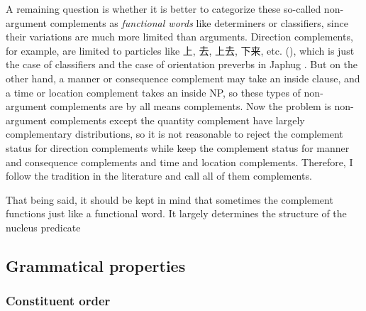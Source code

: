 \documentclass[../main.tex]{subfiles}
\begin{document}
A remaining question is whether it is better 
to categorize these so-called non-argument complements as \emph{functional words} like determiners or classifiers,
since their variations are much more limited than arguments.
Direction complements, for example, are limited to particles like 
上, 去, 上去, 下来, etc. (),
which is just the case of classifiers %
and the case of orientation preverbs in Japhug \citep[]{jacques2021grammar}. 
But on the other hand, a manner or consequence complement may take an inside clause, %
and a time or location complement takes an inside NP, %
so these types of non-argument complements are by all means complements.
Now the problem is non-argument complements except the quantity complement 
have largely complementary distributions,
so it is not reasonable to reject the complement status for direction complements 
while keep the complement status for manner and consequence complements and time and location complements.
Therefore, I follow the tradition in the literature and call all of them complements.

That being said, it should be kept in mind that sometimes the complement functions just like a functional word.
It largely determines the structure of the nucleus predicate %

\subsection{Grammatical properties}

\subsubsection{Constituent order}
\end{document}
